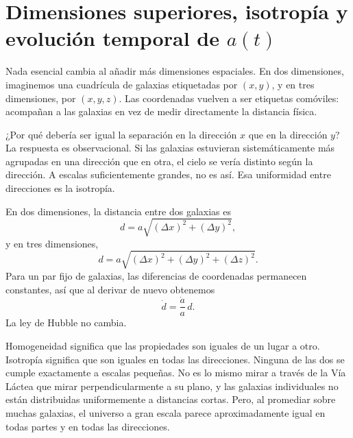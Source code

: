 \section{Dimensiones superiores, isotropía y evolución temporal de \(a(t)\)}

Nada esencial cambia al añadir más dimensiones espaciales. En dos dimensiones, imaginemos una cuadrícula de galaxias etiquetadas por \((x,y)\), y en tres dimensiones, por \((x,y,z)\). Las coordenadas vuelven a ser etiquetas comóviles: acompañan a las galaxias en vez de medir directamente la distancia física.

¿Por qué debería ser igual la separación en la dirección \(x\) que en la dirección \(y\)? La respuesta es observacional. Si las galaxias estuvieran sistemáticamente más agrupadas en una dirección que en otra, el cielo se vería distinto según la dirección. A escalas suficientemente grandes, no es así. Esa uniformidad entre direcciones es la isotropía.

En dos dimensiones, la distancia entre dos galaxias es
\begin{equation}
d=a\sqrt{(\Delta x)^2+(\Delta y)^2},
\end{equation}
y en tres dimensiones,
\begin{equation}
d=a\sqrt{(\Delta x)^2+(\Delta y)^2+(\Delta z)^2}.
\end{equation}
Para un par fijo de galaxias, las diferencias de coordenadas permanecen constantes, así que al derivar de nuevo obtenemos
\begin{equation}
\dot d=\frac{\dot a}{a}\,d.
\end{equation}
La ley de Hubble no cambia.

Homogeneidad significa que las propiedades son iguales de un lugar a otro. Isotropía significa que son iguales en todas las direcciones. Ninguna de las dos se cumple exactamente a escalas pequeñas. No es lo mismo mirar a través de la Vía Láctea que mirar perpendicularmente a su plano, y las galaxias individuales no están distribuidas uniformemente a distancias cortas. Pero, al promediar sobre muchas galaxias, el universo a gran escala parece aproximadamente igual en todas partes y en todas las direcciones.

\begin{classroomqa}\end{classroomqa}

